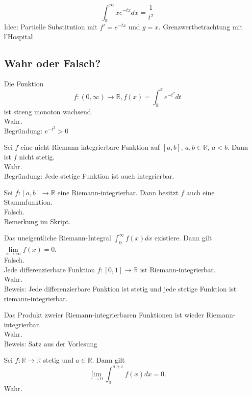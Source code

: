 \begin{displaymath}
  \int_{0}^{\infty} xe^{-tx} dx = \frac{1}{t^2}
\end{displaymath}
Idee: Partielle Substitution mit $f' = e^{-tx}$ und $g = x$. Grenzwertbetrachtung mit l'Hospital

\subsection{Wahr oder Falsch?}
Die Funktion
\begin{displaymath}
  f: (0,\infty) \to \mathbb{R}, f(x) = \int_{0}^{x} e^{-t^2}dt
\end{displaymath}
ist streng monoton wachsend.\\
Wahr.\\
Begründung: $e^{-t^2} > 0$

Sei $f$ eine nicht Riemann-integrierbare Funktion auf $[a,b]$, $a,b \in \mathbb{R}$, $a < b$.
Dann ist $f$ nicht stetig.\\
Wahr.\\
Begründung: Jede stetige Funktion ist auch integrierbar.

Sei $f:[a,b] \to \mathbb{R}$ eine Riemann-integrierbar.
Dann besitzt $f$ auch eine Stammfunktion.\\
Falsch.\\
Bemerkung im Skript.

Das uneigentliche Riemann-Integral $\int_{0}^{\infty} f(x)dx$ existiere.
Dann gilt $\lim\limits_{x \to \infty} f(x) = 0$.\\
Falsch.\\

Jede differenzierbare Funktion $f:[0,1] \to \mathbb{R}$ ist Riemann-integrierbar.\\
Wahr.\\
Beweis: Jede differenzierbare Funktion ist stetig und jede stetige Funktion ist riemann-integrierbar.

Das Produkt zweier Riemann-integrierbaren Funktionen ist wieder Riemann-integrierbar.\\
Wahr.\\
Beweis: Satz aus der Vorlesung

Sei $f: \mathbb{R} \to \mathbb{R}$ stetig und $a \in \mathbb{R}$.
Dann gilt
\begin{displaymath}
  \lim_{\varepsilon \to 0} \int_{a}^{a + \varepsilon} f(x)dx = 0.
\end{displaymath}
Wahr.\\

